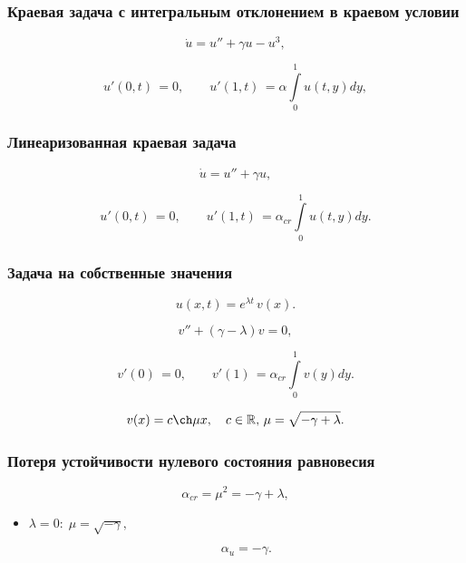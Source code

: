 \documentclass[fullscreen=true, unicode, bookmarks=false]{beamer}
\begin{document}
\begin{frame}
\frametitle{ Краевая задача с интегральным отклонением в краевом условии }
 
\begin{equation}
	\dot u = u'' + \gamma u - u^3,	
\end{equation}

\bigskip

\begin{equation}
	u'(0, t) \, = 0, \qquad u'(1, t) \, = \alpha \int\limits_{0}^{1} u(t, y) dy,
\end{equation}

\end{frame}

\begin{frame}
\frametitle{ Линеаризованная краевая задача }
 
\begin{equation}
	\dot u = u'' + \gamma u,	
\end{equation}

\begin{equation}	
	u'(0, t) \, = 0, \qquad u'(1, t) \, = \alpha_{cr}\int\limits_{0}^{1} u(t, y) dy.
\end{equation}

\end{frame}

\begin{frame}
\frametitle{ Задача на собственные значения }
 
$$ u(x, t) = e^{\lambda t} \, v(x). $$

\bigskip
\pause
 
\begin{equation}
	v'' + (\gamma - \lambda)v = 0,	
\end{equation}

\begin{equation}	
	v'(0) \, = 0, \qquad v'(1) \, = \alpha_{cr}\int\limits_{0}^{1} v(y) dy.
\end{equation}

\bigskip
\pause

$$ v(x) = c \ch  \mu x, \quad c \in \mathbb{R}, \, \mu = \sqrt{-\gamma + \lambda}. $$

\end{frame}

\begin{frame}
\frametitle{ Потеря устойчивости нулевого состояния равновесия }
 
\begin{equation}
	\alpha_{cr} = \mu^2 = -\gamma + \lambda,
\end{equation}

\bigskip
\pause

\begin{itemize}

\item { $ \lambda = 0: \; \mu = \sqrt{-\gamma}, $ 
}

\begin{equation}
	\alpha_u = -\gamma.
\end{equation}

\end{itemize}	

\end{frame}
\end{document}

